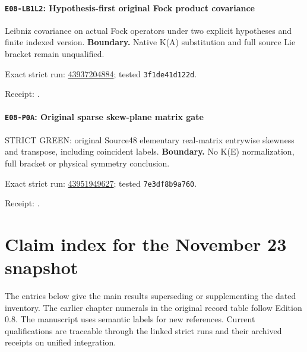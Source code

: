 \paragraph{\texttt{E08-LB1L2}: Hypothesis-first original Fock product covariance}
Leibniz covariance on actual Fock operators under two explicit hypotheses and finite indexed version.
\textbf{Boundary.} Native K(A) substitution and full source Lie bracket remain unqualified.
\par\noindent Exact strict run: \href{https://github.com/etblink/math/actions/runs/43937204884}{43937204884}; tested \texttt{3f1de41d122d}.\par
\begingroup\small\sloppy\noindent Receipt: .\par\endgroup
\paragraph{\texttt{E08-P0A}: Original sparse skew-plane matrix gate}
STRICT GREEN: original Source48 elementary real-matrix entrywise skewness and transpose, including coincident labels.
\textbf{Boundary.} No K(E) normalization, full bracket or physical symmetry conclusion.
\par\noindent Exact strict run: \href{https://github.com/etblink/math/actions/runs/43951949627}{43951949627}; tested \texttt{7e3df8b9a760}.\par
\begingroup\small\sloppy\noindent Receipt: .\par\endgroup

\section{Claim index for the November 23 snapshot}
The entries below give the main results superseding or supplementing
the dated inventory. The earlier chapter numerals in the original
record table follow Edition 0.8. The manuscript uses semantic labels
for new references. Current qualifications are traceable through the
linked strict runs and their archived receipts on unified integration.

